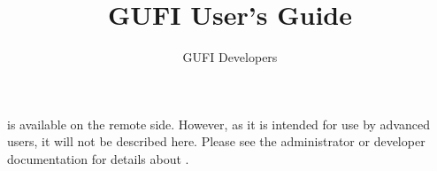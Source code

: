 \documentclass{article}
\title{GUFI User's Guide}
\author{GUFI Developers}
\begin{document}
\maketitle

\tableofcontents










\section{\gufiquery}
\gufiquery is available on the remote side. However, as it is intended
for use by advanced users, it will not be described here. Please see
the administrator or developer documentation for details about
\gufiquery.
\end{document}
